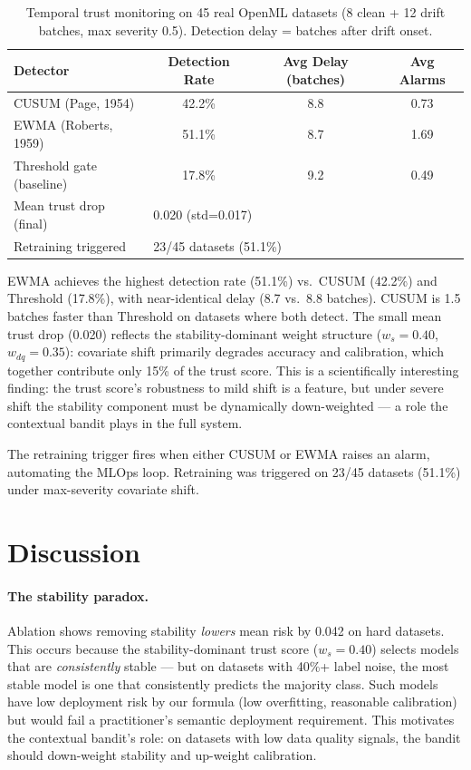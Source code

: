 \documentclass[10pt]{article}
\begin{document}
\begin{table}[h]
\centering
\caption{Temporal trust monitoring on 45 real OpenML datasets (8 clean + 12 drift batches, max severity 0.5). Detection delay = batches after drift onset.}
\label{tab:temporal_monitoring}
\begin{tabular}{lccc}
\toprule
\textbf{Detector} & \textbf{Detection Rate} & \textbf{Avg Delay (batches)} & \textbf{Avg Alarms} \\
\midrule
CUSUM (Page, 1954) & 42.2\% & 8.8 & 0.73 \\
EWMA (Roberts, 1959) & 51.1\% & 8.7 & 1.69 \\
Threshold gate (baseline) & 17.8\% & 9.2 & 0.49 \\
\midrule
Mean trust drop (final) & \multicolumn{3}{l}{0.020 (std=0.017)} \\
Retraining triggered & \multicolumn{3}{l}{23/45 datasets (51.1\%)} \\
\bottomrule
\end{tabular}
\end{table}

EWMA achieves the highest detection rate (51.1\%) vs.\ CUSUM (42.2\%) and Threshold (17.8\%), with near-identical delay (8.7 vs.\ 8.8 batches). CUSUM is 1.5 batches faster than Threshold on datasets where both detect. The small mean trust drop (0.020) reflects the stability-dominant weight structure ($w_s{=}0.40$, $w_{dq}{=}0.35$): covariate shift primarily degrades accuracy and calibration, which together contribute only 15\% of the trust score. This is a scientifically interesting finding: the trust score's robustness to mild shift is a feature, but under severe shift the stability component must be dynamically down-weighted — a role the contextual bandit plays in the full system.

The retraining trigger fires when either CUSUM or EWMA raises an alarm, automating the MLOps loop. Retraining was triggered on 23/45 datasets (51.1\%) under max-severity covariate shift.

\section{Discussion}
\label{sec:discussion}

\paragraph{The stability paradox.}
Ablation shows removing stability \emph{lowers} mean risk by 0.042 on hard datasets. This occurs because the stability-dominant trust score ($w_s{=}0.40$) selects models that are \emph{consistently} stable — but on datasets with 40\%+ label noise, the most stable model is one that consistently predicts the majority class. Such models have low deployment risk by our formula (low overfitting, reasonable calibration) but would fail a practitioner's semantic deployment requirement. This motivates the contextual bandit's role: on datasets with low data quality signals, the bandit should down-weight stability and up-weight calibration.
\end{document}
